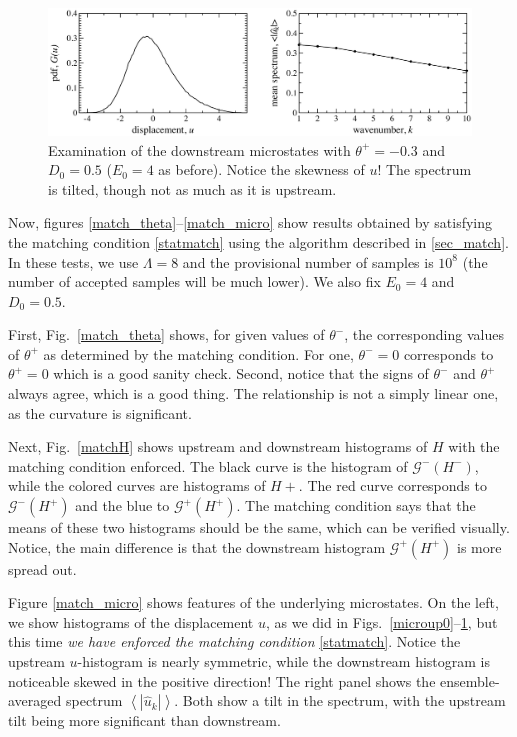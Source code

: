 \documentclass[12pt]{article}
\newcommand{\abs}[1]{\left| #1 \right|}
\newcommand{\mean}[1]{\left< #1 \right>}
\newcommand{\uhat}{\hat{u}}
\newcommand{\Gibbs}{\mathcal{G}}
\begin{document}
\begin{figure}[p]%
\begin{center}
\includegraphics[width = 0.8 \textwidth]{microdn3}
\caption{Examination of the downstream microstates with $\theta^+ = -0.3$ and $D_0 = 0.5$ ($E_0 = 4$ as before). Notice the skewness of $u$! The spectrum is tilted, though not as much as it is upstream.}
\label{microdn3}
\end{center}
\end{figure}
 
Now, figures \ref{match_theta}--\ref{match_micro} show results obtained by satisfying the matching condition \eqref{statmatch} using the algorithm described in \ref{sec_match}. In these tests, we use $\Lambda = 8$ and the provisional number of samples is $10^8$ (the number of accepted samples will be much lower). We also fix $E_0 = 4$ and $D_0 = 0.5$.

First, Fig.~\ref{match_theta} shows, for given values of $\theta^-$, the corresponding values of $\theta^+$ as determined by the matching condition. For one, $\theta^- = 0$ corresponds to $\theta^+ = 0$ which is a good sanity check. Second, notice that the signs of $\theta^-$ and $\theta^+$ always agree, which is a good thing. The relationship is not a simply linear one, as the curvature is significant.
 
 Next, Fig.~\ref{matchH} shows upstream and downstream histograms of $H$ with the matching condition enforced. The black curve is the histogram of $\Gibbs^-(H^-)$, while the colored curves are histograms of $H+$. The red curve corresponds to $\Gibbs^-(H^+)$ and the blue to $\Gibbs^+(H^+)$. The matching condition says that the means of these two histograms should be the same, which can be verified visually. Notice, the main difference is that the downstream histogram $\Gibbs^+(H^+)$ is more spread out.
 
Figure \ref{match_micro} shows features of the underlying microstates. On the left, we show histograms of the displacement $u$, as we did in Figs.~\ref{microup0}--\ref{microdn3}, but this time {\em we have enforced the matching condition} \eqref{statmatch}. Notice the upstream $u$-histogram is nearly symmetric, while the downstream histogram is noticeable skewed in the positive direction! The right panel shows the ensemble-averaged spectrum $\mean{\abs{\uhat_k}}$. Both show a tilt in the spectrum, with the upstream tilt being more significant than downstream.
\end{document}
